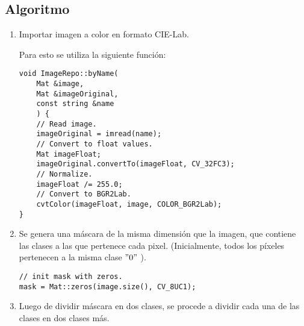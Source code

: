 \subsection{Algoritmo}\label{subsec:algorithm}

\begin{enumerate}
    \item Importar imagen a color en formato CIE-Lab.

    Para esto se utiliza la siguiente función:
    \begin{lstlisting}[label={lst:load-image}]
void ImageRepo::byName(
    Mat &image,
    Mat &imageOriginal,
    const string &name
    ) {
    // Read image.
    imageOriginal = imread(name);
    // Convert to float values.
    Mat imageFloat;
    imageOriginal.convertTo(imageFloat, CV_32FC3);
    // Normalize.
    imageFloat /= 255.0;
    // Convert to BGR2Lab.
    cvtColor(imageFloat, image, COLOR_BGR2Lab);
}
    \end{lstlisting}

    \item Se genera una máscara de la misma dimensión que la imagen, que contiene las clases a las que pertenece cada pixel.
    (Inicialmente, todos los píxeles pertenecen a la misma clase \("0"\) ).

    \begin{lstlisting}[label={lst:init-mask}]
// init mask with zeros.
mask = Mat::zeros(image.size(), CV_8UC1);
    \end{lstlisting}

    \item Luego de dividir máscara en dos clases, se procede a dividir cada una de las clases en dos clases más.
\end{enumerate}
